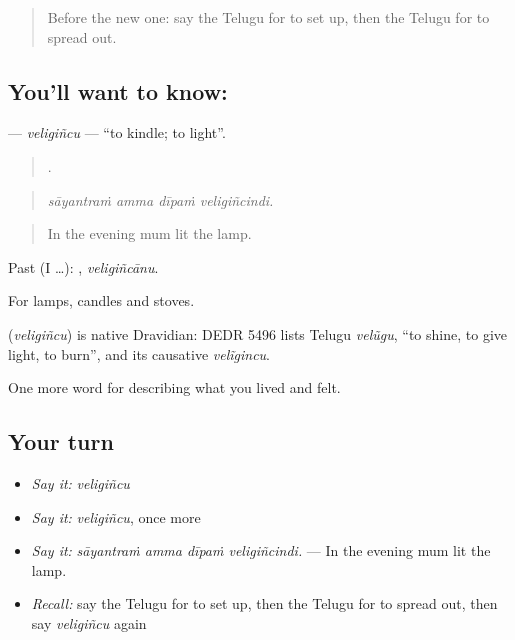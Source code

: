 \label{lesson:TE-C549-veligincu}



\begin{quote}
Before the new one: say the Telugu for to set up, then the Telugu for to spread out.
\end{quote}

\subsection*{You'll want to know: }
\textbf{} — \emph{veligiñcu} — \textquotedblleft{}to kindle; to light\textquotedblright{}.

\begin{quote}
   .
\end{quote}

\begin{quote}
\emph{sāyantraṁ amma dīpaṁ veligiñcindi.}
\end{quote}

\begin{quote}
In the evening mum lit the lamp.
\end{quote}

Past (I …): , \emph{veligiñcānu}.

For lamps, candles and stoves.

\begin{cousinweb}
\textbf{} (\emph{veligiñcu}) is native Dravidian: DEDR 5496 lists Telugu \emph{velũgu}, \textquotedblleft{}to shine, to give light, to burn\textquotedblright{}, and its causative \emph{velĩgincu}.
\end{cousinweb}

\begin{grammarlens}[title={What you've built}]
One more word for describing what you lived and felt.
\end{grammarlens}

\subsection*{Your turn}
\begin{itemize}
\raggedright
  \item \emph{Say it:} \emph{veligiñcu}
  \item \emph{Say it:} \emph{veligiñcu}, once more
  \item \emph{Say it:} \emph{sāyantraṁ amma dīpaṁ veligiñcindi.} — In the evening mum lit the lamp.
  \item \emph{Recall:} say the Telugu for to set up, then the Telugu for to spread out, then say \emph{veligiñcu} again
\end{itemize}

